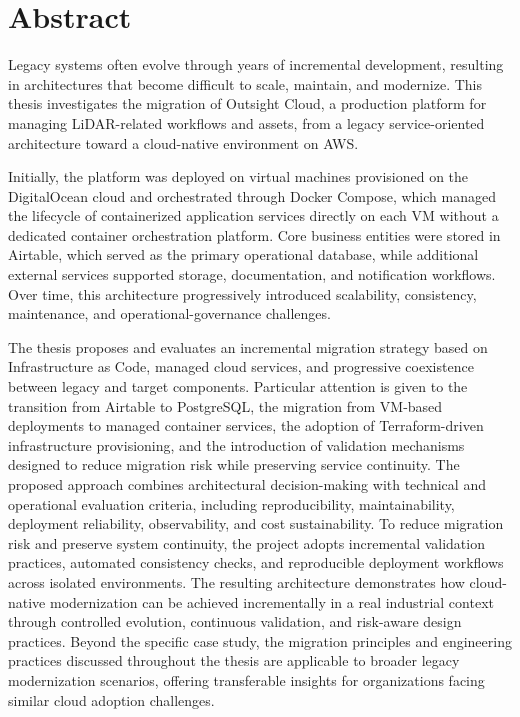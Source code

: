\chapter*{Abstract}

Legacy systems often evolve through years of incremental development, resulting in architectures that become difficult to scale, maintain, and modernize. This thesis investigates the migration of Outsight Cloud, a production platform for managing LiDAR-related workflows and assets, from a legacy service-oriented architecture toward a cloud-native environment on AWS.

Initially, the platform was deployed on virtual machines provisioned on the DigitalOcean cloud and orchestrated through Docker Compose, which managed the lifecycle of containerized application services directly on each VM without a dedicated container orchestration platform. Core business entities were stored in Airtable, which served as the primary operational database, while additional external services supported storage, documentation, and notification workflows. Over time, this architecture progressively introduced scalability, consistency, maintenance, and operational-governance challenges.

The thesis proposes and evaluates an incremental migration strategy based on Infrastructure as Code, managed cloud services, and progressive coexistence between legacy and target components. Particular attention is given to the transition from Airtable to PostgreSQL, the migration from VM-based deployments to managed container services, the adoption of Terraform-driven infrastructure provisioning, and the introduction of validation mechanisms designed to reduce migration risk while preserving service continuity. The proposed approach combines architectural decision-making with technical and operational evaluation criteria, including reproducibility, maintainability, deployment reliability, observability, and cost sustainability. To reduce migration risk and preserve system continuity, the project adopts incremental validation practices, automated consistency checks, and reproducible deployment workflows across isolated environments. The resulting architecture demonstrates how cloud-native modernization can be achieved incrementally in a real industrial context through controlled evolution, continuous validation, and risk-aware design practices. Beyond the specific case study, the migration principles and engineering practices discussed throughout the thesis are applicable to broader legacy modernization scenarios, offering transferable insights for organizations facing similar cloud adoption challenges.
